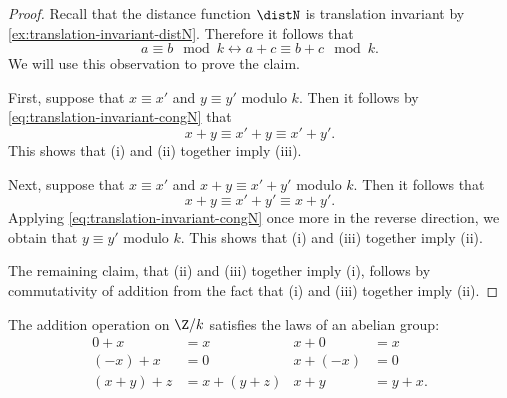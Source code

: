 \begin{proof}
  Recall that the distance function $\distN$ is translation invariant by \cref{ex:translation-invariant-distN}. Therefore it follows that
  \begin{equation}\label{eq:translation-invariant-congN}
    a\equiv b\mod k \leftrightarrow a+c\equiv b+c\mod k.\tag{\textasteriskcentered}
  \end{equation}
  We will use this observation to prove the claim.
  
  First, suppose that $x\equiv x'$ and $y\equiv y'$ modulo $k$. Then it follows by \cref{eq:translation-invariant-congN} that
  \begin{equation*}
    x+y\equiv x'+y\equiv x'+y'.
  \end{equation*}
  This shows that (i) and (ii) together imply (iii).

  Next, suppose that $x\equiv x'$ and $x+y\equiv x'+y'$ modulo $k$. Then it follows that
  \begin{equation*}
    x+y\equiv x'+y'\equiv x+y'.
  \end{equation*}
  Applying \cref{eq:translation-invariant-congN} once more in the reverse direction, we obtain that $y\equiv y'$ modulo $k$. This shows that (i) and (iii) together imply (ii).

  The remaining claim, that (ii) and (iii) together imply (i), follows by commutativity of addition from the fact that (i) and (iii) together imply (ii).
\end{proof}

\begin{thm}
  The addition operation on $\Z/{k}$ satisfies the laws of an abelian group:
  \begin{align*}
    0+x & = x & x+0 & = x \\
    (-x)+x & = 0 & x+(-x) & = 0 \\
    (x+y)+z & = x+(y+z) & x+y & = y+x. 
  \end{align*}
\end{thm}

